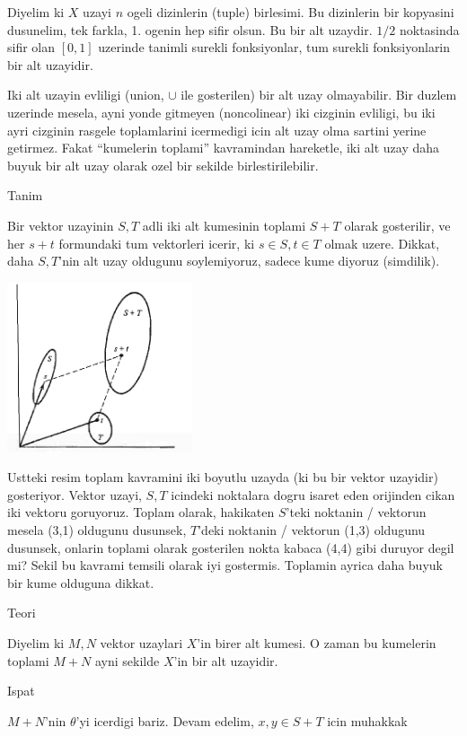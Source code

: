 \documentclass[12pt,fleqn]{article}
\begin{document}
Diyelim ki $X$ uzayi $n$ ogeli dizinlerin (tuple) birlesimi. Bu dizinlerin
bir kopyasini dusunelim, tek farkla, 1. ogenin hep sifir olsun. Bu bir alt
uzaydir. $1/2$ noktasinda sifir olan $[0,1]$ uzerinde tanimli surekli
fonksiyonlar, tum surekli fonksiyonlarin bir alt uzayidir. 

Iki alt uzayin evliligi (union, $\cup$ ile gosterilen) bir alt uzay
olmayabilir. Bir duzlem uzerinde mesela, ayni yonde gitmeyen (noncolinear)
iki cizginin evliligi, bu iki ayri cizginin rasgele toplamlarini icermedigi
icin alt uzay olma sartini yerine getirmez. Fakat ``kumelerin toplami''
kavramindan hareketle, iki alt uzay daha buyuk bir alt uzay olarak ozel bir
sekilde birlestirilebilir.

Tanim

Bir vektor uzayinin $S,T$ adli iki alt kumesinin toplami $S+T$ olarak
gosterilir, ve her $s+t$ formundaki tum vektorleri icerir, ki $s \in S,t
\in T$ 
olmak uzere. Dikkat, daha $S,T$'nin alt uzay oldugunu soylemiyoruz, sadece
kume diyoruz (simdilik). 

\includegraphics[height=5cm]{3_1.png}

Ustteki resim toplam kavramini iki boyutlu uzayda (ki bu bir vektor
uzayidir) gosteriyor. Vektor uzayi, $S,T$ icindeki noktalara dogru isaret
eden orijinden cikan iki vektoru goruyoruz. Toplam olarak, hakikaten
$S$'teki noktanin / vektorun mesela (3,1) oldugunu dusunsek, $T$'deki
noktanin / vektorun (1,3) oldugunu dusunsek, onlarin toplami olarak
gosterilen nokta kabaca (4,4) gibi duruyor degil mi? Sekil bu kavrami
temsili olarak iyi gostermis. Toplamin ayrica daha buyuk bir kume olduguna
dikkat. 

Teori 

Diyelim ki $M,N$ vektor uzaylari $X$'in birer alt kumesi. O zaman bu kumelerin
toplami $M + N$ ayni sekilde $X$'in bir alt uzayidir. 

Ispat 

$M+N$'nin $\theta$'yi icerdigi bariz. Devam edelim, $x,y \in S+T$ icin
muhakkak 
\end{document}
